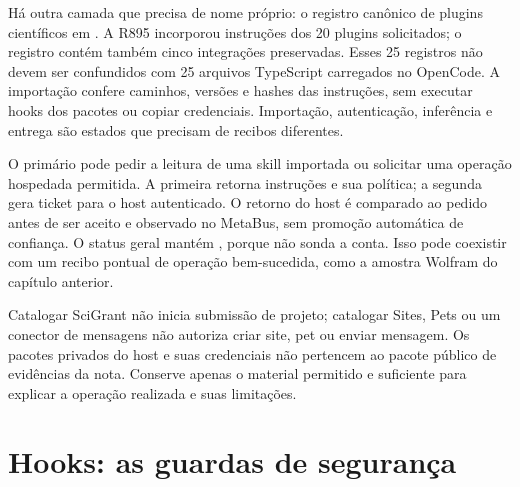 \begin{descricao}
Há outra camada que precisa de nome próprio: o registro canônico de plugins
científicos em . A R895 incorporou
instruções dos 20 plugins solicitados; o registro contém também cinco
integrações preservadas. Esses 25 registros não devem ser confundidos com
25 arquivos TypeScript carregados no OpenCode. A importação confere caminhos,
versões e hashes das instruções, sem executar hooks dos pacotes ou copiar
credenciais. Importação, autenticação, inferência e entrega são estados que
precisam de recibos diferentes.
\end{descricao}

\begin{metodo}
O primário pode pedir a leitura de uma skill importada ou solicitar uma
operação hospedada permitida. A primeira retorna instruções e sua política;
a segunda gera ticket para o host autenticado. O retorno do host é comparado
ao pedido antes de ser aceito e observado no MetaBus, sem promoção automática
de confiança. O status geral mantém ,
porque não sonda a conta. Isso pode coexistir com um recibo pontual de operação
bem-sucedida, como a amostra Wolfram do capítulo anterior.
\end{metodo}

\begin{aviso}
Catalogar SciGrant não inicia submissão de projeto; catalogar Sites, Pets ou
um conector de mensagens não autoriza criar site, pet ou enviar mensagem.
Os pacotes privados do host e suas credenciais não pertencem ao pacote público
de evidências da nota. Conserve apenas o material permitido e suficiente para
explicar a operação realizada e suas limitações.
\end{aviso}

\clearpage
\section{Hooks: as guardas de segurança}


